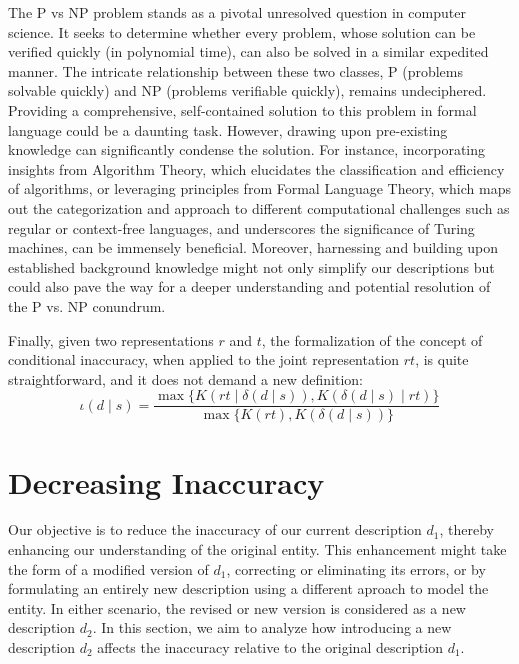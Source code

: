 \begin{example}
The P vs NP problem stands as a pivotal unresolved question in computer science. It seeks to determine whether every problem, whose solution can be verified quickly (in polynomial time), can also be solved in a similar expedited manner. The intricate relationship between these two classes, P (problems solvable quickly) and NP (problems verifiable quickly), remains undeciphered. Providing a comprehensive, self-contained solution to this problem in formal language could be a daunting task. However, drawing upon pre-existing knowledge can significantly condense the solution. For instance, incorporating insights from Algorithm Theory, which elucidates the classification and efficiency of algorithms, or leveraging principles from Formal Language Theory, which maps out the categorization and approach to different computational challenges such as regular or context-free languages, and underscores the significance of Turing machines, can be immensely beneficial. Moreover, harnessing and building upon established background knowledge might not only simplify our descriptions but could also pave the way for a deeper understanding and potential resolution of the P vs. NP conundrum.
\end{example}

Finally, given two representations $r$ and $t$, the formalization of the concept of conditional inaccuracy, when applied to the joint representation $rt$, is quite straightforward, and it does not demand a new definition:
\[
\iota(d \mid s) = \frac{ \max\{ K \left(rt \mid \delta(d \mid s) \right), K \left( \delta(d \mid s) \mid rt \right) \} } { \max\{ K(rt), K \left(\delta(d \mid s) \right) \} }
\]


%
%

\section{Decreasing Inaccuracy}

Our objective is to reduce the inaccuracy of our current description $d_1$, thereby enhancing our understanding of the original entity. This enhancement might take the form of a modified version of $d_1$, correcting or eliminating its errors, or by formulating an entirely new description using a different aproach to model the entity. In either scenario, the revised or new version is considered as a new description $d_2$. In this section, we aim to analyze how introducing a new description $d_2$ affects the inaccuracy relative to the original description $d_1$.

